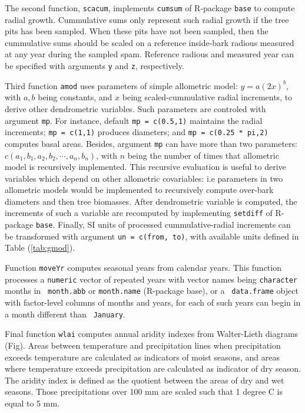 \documentclass[review,authoryear]{elsarticle}
\begin{document}
The second function, {\tt scacum}, implements {\tt cumsum} of
R-package {\tt base} to compute radial growth. Cummulative sums only
represent such radial growth if the tree pits has been sampled. When
these pits have not been sampled, then the cummulative sums should be
scaled on a reference inside-bark radious measured at any year during
the sampled spam. Reference radious and measured year can be specified
with arguments {\tt y} and {\tt z}, respectively.

Third function {\tt amod} uses parameters of simple allometric model:
$y=a(2x)^b$, with $a,b$ being constants, and $x$ being
scaled-cummulative radial increments, to derive other dendrometric
variables. Such parameters are controled with argument {\tt mp}. For
instance, default {\tt mp = c(0.5,1)} maintains the radial increments;
{\tt mp = c(1,1)} produces diameters; and {\tt mp = c(0.25 * pi,2)}
computes basal areas. Besides, argument {\tt mp} can have more than
two parameters: $c(a_1,b_1,a_2,b_2,\cdots, a_n,b_n)$, with $n$ being
the number of times that allometric model is recursively
implemented. This recursive evaluation is useful to derive variables
which depend on other allometric covariables: i.e parameters in two
allometric models would be implemented to recursively compute
over-bark diameters and then tree biomasses. After dendrometric
variable is computed, the increments of such a variable are recomputed
by implementing {\tt setdiff} of R-package {\tt base}. Finally, SI
units of processed cummulative-radial increments can be transformed
with argument {\tt un = c(from, to)}, with available units defined in
Table (\ref{tab:gmod}).

Function {\tt moveYr} computes seasonal years from calendar
years. This function processes a {\tt numeric} vector of repeated
years with vector names being {\tt character} months in {\tt
  month.abb} or {\tt month.name} (R-package base), or a {\tt
  data.frame} object with factor-level columns of months and years,
for each of such years can begin in a month different than {\tt
  January}.

Final function {\tt wlai} computes annual aridity indexes from
Walter-Lieth diagrams (Fig). Areas between temperature and
precipitation lines when precipitation exceeds temperature are
calculated as indicators of moist seasons, and areas where temperature
exceeds precipitation are calculated as indicator of dry season. The
aridity index is defined as the quotient between the areas of dry and
wet seasons. Those precipitations over 100 mm are scaled such that 1
degree C is equal to 5 mm.
\end{document}
